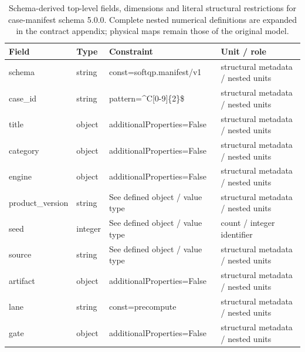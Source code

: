 \begin{table}[htbp]\centering\footnotesize
\caption{Schema-derived top-level fields, dimensions and literal structural restrictions for case-manifest schema 5.0.0. Complete nested numerical definitions are expanded in the contract appendix; physical maps remain those of the original model.}\label{tab:contract-case-manifest}
\begin{tabularx}{\textwidth}{@{}>{\raggedright\arraybackslash}p{}>{\raggedright\arraybackslash}p{}>{\raggedright\arraybackslash}X>{\raggedright\arraybackslash}X@{}}\toprule
Field & Type & Constraint & Unit / role\\\midrule
schema & string & const=\allowbreak{}softqp.\allowbreak{}manifest/\allowbreak{}v1 & structural metadata /\allowbreak{} nested units\\
case\_\allowbreak{}id & string & pattern=\allowbreak{}\textasciicircum{}C[0-9]\{2\}\$ & structural metadata /\allowbreak{} nested units\\
title & object & additionalProperties=\allowbreak{}False & structural metadata /\allowbreak{} nested units\\
category & object & additionalProperties=\allowbreak{}False & structural metadata /\allowbreak{} nested units\\
engine & object & additionalProperties=\allowbreak{}False & structural metadata /\allowbreak{} nested units\\
product\_\allowbreak{}version & string & See defined object /\allowbreak{} value type & structural metadata /\allowbreak{} nested units\\
seed & integer & See defined object /\allowbreak{} value type & count /\allowbreak{} integer identifier\\
source & string & See defined object /\allowbreak{} value type & structural metadata /\allowbreak{} nested units\\
artifact & object & additionalProperties=\allowbreak{}False & structural metadata /\allowbreak{} nested units\\
lane & string & const=\allowbreak{}precompute & structural metadata /\allowbreak{} nested units\\
gate & object & additionalProperties=\allowbreak{}False & structural metadata /\allowbreak{} nested units\\
\bottomrule\end{tabularx}
\end{table}
